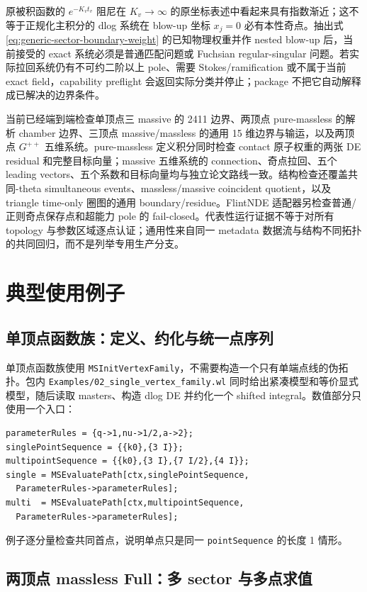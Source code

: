 \documentclass[11pt,a4paper]{ctexart}
\begin{document}
原被积函数的 $e^{-K_vt_v}$ 阻尼在 $K_v\to\infty$ 的原坐标表述中看起来具有指数渐近；这不等于正规化主积分的 dlog 系统在 blow-up 坐标 $x_j=0$ 必有本性奇点。抽出式 \eqref{eq:generic-sector-boundary-weight} 的已知物理权重并作 nested blow-up 后，当前接受的 exact 系统必须是普通匹配问题或 Fuchsian regular-singular 问题。若实际拉回系统仍有不可约二阶以上 pole、需要 Stokes/ramification 或不属于当前 exact field，capability preflight 会返回实际分类并停止；package 不把它自动解释成已解决的边界条件。

当前已经端到端检查单顶点三 massive 的 2411 边界、两顶点 pure-massless 的解析 chamber 边界、三顶点 massive/massless 的通用 15 维边界与输运，以及两顶点 $G^{++}$ 五维系统。pure-massless 定义积分同时检查 contact 原子权重的两张 DE residual 和完整目标向量；massive 五维系统的 connection、奇点拉回、五个 leading vectors、五个系数和目标向量均与独立论文路线一致。结构检查还覆盖共同-theta simultaneous events、massless/massive coincident quotient，以及 triangle time-only 圈图的通用 boundary/residue。FlintNDE 适配器另检查普通/正则奇点保存点和超能力 pole 的 fail-closed。代表性运行证据不等于对所有 topology 与参数区域逐点认证；通用性来自同一 metadata 数据流与结构不同拓扑的共同回归，而不是列举专用生产分支。

\section{典型使用例子}

\subsection{单顶点函数族：定义、约化与统一点序列}

单顶点函数族使用 \texttt{MSInitVertexFamily}，不需要构造一个只有单端点线的伪拓扑。包内
\texttt{Examples/02\_single\_vertex\_family.wl} 同时给出紧凑模型和等价显式模型，随后读取
masters、构造 dlog DE 并约化一个 shifted integral。数值部分只使用一个入口：
\begin{verbatim}
parameterRules = {q->1,nu->1/2,a->2};
singlePointSequence = {{k0},{3 I}};
multipointSequence = {{k0},{3 I},{7 I/2},{4 I}};
single = MSEvaluatePath[ctx,singlePointSequence,
  ParameterRules->parameterRules];
multi  = MSEvaluatePath[ctx,multipointSequence,
  ParameterRules->parameterRules];
\end{verbatim}
例子逐分量检查共同首点，说明单点只是同一 \texttt{pointSequence} 的长度 1 情形。

\subsection{两顶点 massless Full：多 sector 与多点求值}
\end{document}
